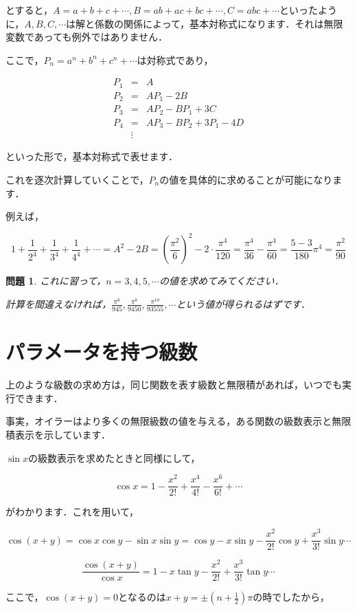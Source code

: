 \documentclass[./main]{subfiles}
\theoremstyle{break}
\newtheorem*{prb}{問題}
\begin{document}
とすると，$A=a+b+c+\cdots,B=ab+ac+bc+\cdots,C=abc+\cdots$といったように，$A,B,C,\cdots$は解と係数の関係によって，基本対称式になります．それは無限変数であっても例外ではありません．

ここで，$P_n=a^n+b^n+c^n+\cdots$は対称式であり，

\begin{eqnarray*}
P_1&=&A\\
P_2&=&AP_1-2B\\
P_3&=&AP_2-BP_1+3C\\
P_4&=&AP_3-BP_2+3P_1-4D\\
&\vdots&
\end{eqnarray*}

といった形で，基本対称式で表せます．

これを逐次計算していくことで，$P_n$の値を具体的に求めることが可能になります．

例えば，

\[1+\frac{1}{2^4}+\frac{1}{3^4}+\frac{1}{4^4}+\cdots=A^2-2B=\left( \frac{\pi^2}{6} \right)^2-2\cdot\frac{\pi^4}{120}=\frac{\pi^4}{36}-\frac{\pi^4}{60}=\frac{5-3}{180}\pi^4=\frac{\pi^2}{90}\]

\begin{prb}
これに習って，$n=3,4,5,\cdots$の値を求めてみてください．

計算を間違えなければ，$\displaystyle \frac{\pi^6}{945},\frac{\pi^8}{9450},\frac{\pi^{10}}{93555},\cdots$という値が得られるはずです．

\end{prb}
\section{パラメータを持つ級数}
上のような級数の求め方は，同じ関数を表す級数と無限積があれば，いつでも実行できます．

事実，オイラーはより多くの無限級数の値を与える，ある関数の級数表示と無限積表示を示しています．

$\sin x$の級数表示を求めたときと同様にして，

\[\cos x=1-\frac{x^2}{2!}+\frac{x^4}{4!}-\frac{x^6}{6!}+\cdots\]

がわかります．これを用いて，

\[\cos(x+y)=\cos x\cos y-\sin x \sin y=\cos y -x\sin y -\frac{x^2}{2!}\cos y+\frac{x^3}{3!}\sin y\cdots\]

\[\frac{\cos (x+y)}{\cos x}=1 -x\tan y- \frac{x^2}{2!}+\frac{x^3}{3!}\tan y\cdots\]

ここで，$\cos (x+y)=0$となるのは$x+y=\pm \left(n+\frac{1}{2}\right)\pi$の時でしたから，
\end{document}
